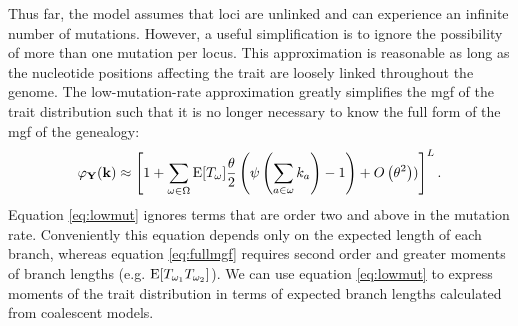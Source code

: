 Thus far, the model assumes that loci are unlinked and can experience an
infinite number of mutations. However, a useful simplification is to ignore the
possibility of more than one mutation per locus. This approximation is
reasonable as long as the nucleotide positions affecting the trait are loosely
linked throughout the genome. The low-mutation-rate approximation greatly
simplifies the mgf of the trait distribution such that it is no longer necessary
to know the full form of the mgf of the genealogy:
\begin{equation}
\label{eq:lowmut}
\varphi_{\mathbf{Y}}(\mathbf{k}) \approx \left[ 1 + \sum_{\omega \in \Omega}
  \mathrm{E}[T_\omega] \frac{\theta}{2} \left( \psi\left( \sum_{a \in \omega} k_a\right) -1 \right) +
  O\left( \theta^2 \right))\right]^L.
\end{equation}
Equation \eqref{eq:lowmut} ignores terms that are order two and above in the
mutation rate. Conveniently this equation depends only on the expected length of
each branch, whereas equation \eqref{eq:fullmgf} requires second order and
greater moments of branch lengths (e.g. $\mathrm{E}[T_{\omega_1}T_{\omega_2}]$). We can
use equation \eqref{eq:lowmut} to express moments of the trait distribution in
terms of expected branch lengths calculated from coalescent models.

